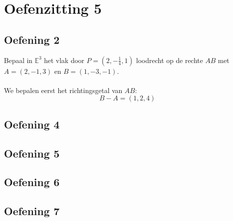 \documentclass[main.tex]{subfiles}
\begin{document}
\section{Oefenzitting 5}

\subsection*{Oefening 2}
Bepaal in $\mathbb{E}^{3}$ het vlak door $P=\left(2,-\frac{1}{4},1\right)$ loodrecht op de rechte $AB$ met $A=(2,-1,3)$ en $B=(1,-3,-1)$.\\\\
We bepalen eerst het richtingsgetal van $AB$:
\[ B-A=(1,2,4) \]
\subsection*{Oefening 4}
\subsection*{Oefening 5}
\subsection*{Oefening 6}
\subsection*{Oefening 7}
\end{document}
